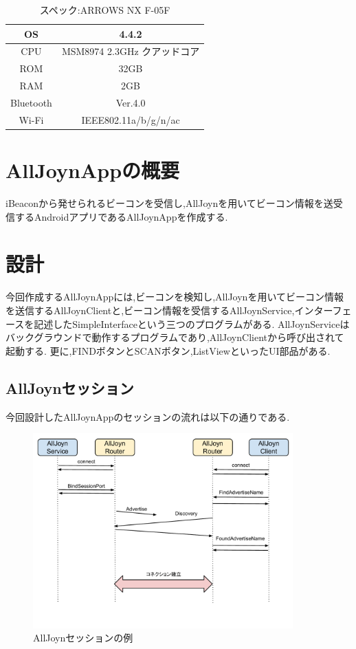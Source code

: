 \begin{table}[htbp]
\centering
\begin{tabular}{|c|c|} \hline
OS &  4.4.2 \\ \hline
CPU & MSM8974 2.3GHz クアッドコア \\ \hline
ROM & 32GB \\ \hline
RAM & 2GB \\ \hline
Bluetooth & Ver.4.0 \\ \hline
Wi-Fi & IEEE802.11a/b/g/n/ac \\ \hline
\end{tabular}
\caption{スペック:ARROWS NX F-05F}
\end{table}


\section{AllJoynAppの概要}
iBeaconから発せられるビーコンを受信し,AllJoynを用いてビーコン情報を送受信するAndroidアプリであるAllJoynAppを作成する.


\section{設計}
今回作成するAllJoynAppには,ビーコンを検知し,AllJoynを用いてビーコン情報を送信するAllJoynClientと,ビーコン情報を受信するAllJoynService,インターフェースを記述したSimpleInterfaceという三つのプログラムがある.
AllJoynServiceはバックグラウンドで動作するプログラムであり,AllJoynClientから呼び出されて起動する.
更に,FINDボタンとSCANボタン,ListViewといったUI部品がある.


\subsection{AllJoynセッション}
今回設計したAllJoynAppのセッションの流れは以下の通りである.

\begin{figure}[htbp]
\centering
\includegraphics[width=10cm]{fig/AllJoyn_Session.pdf}
\caption{AllJoynセッションの例}
\end{figure}


